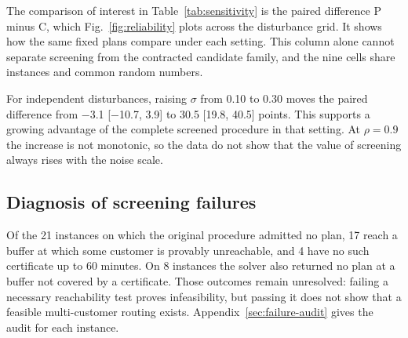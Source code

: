 The comparison of interest in Table~\ref{tab:sensitivity} is the paired difference P minus C, which Fig.~\ref{fig:reliability} plots across the disturbance grid. It shows how the same fixed plans compare under each setting. This column alone cannot separate screening from the contracted candidate family, and the nine cells share instances and common random numbers.

For independent disturbances, raising $\sigma$ from 0.10 to 0.30 moves the paired difference from $-$3.1 [$-$10.7, 3.9] to 30.5 [19.8, 40.5] points. This supports a growing advantage of the complete screened procedure in that setting. At $\rho=0.9$ the increase is not monotonic, so the data do not show that the value of screening always rises with the noise scale.

\subsection{Diagnosis of screening failures}

Of the 21 instances on which the original procedure admitted no plan, 17 reach a buffer at which some customer is provably unreachable, and 4 have no such certificate up to 60 minutes. On 8 instances the solver also returned no plan at a buffer not covered by a certificate. Those outcomes remain unresolved: failing a necessary reachability test proves infeasibility, but passing it does not show that a feasible multi-customer routing exists. Appendix~\ref{sec:failure-audit} gives the audit for each instance.